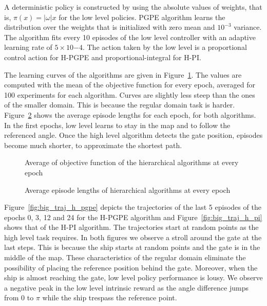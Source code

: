 A deterministic policy is constructed by using the absolute values of  weights, that is,  $\pi(x) = \left|\omega\right|x$ for the low level policies. PGPE algorithm learns the distribution over the weights that is initialized with zero mean and $10^{-3}$ variance. The algorithm fits every 10 episodes of the low level controller with an adaptive learning rate of $5\times10{-4}$. The action taken by the low level is a proportional control action for H-PGPE and proportional-integral for H-PI. 

The learning curves of the algorithms are given in Figure~\ref{fig:big_hier_J}. The values are computed with the mean of the objective function for every epoch, averaged for 100 experiments for each algorithm. Curves are slightly less steep than the ones of the smaller domain. This is because the regular domain task is harder. Figure~\ref{fig:big_hier_L} shows the average episode lengths for each epoch, for both algorithms. In the first epochs, low level learns to stay in the map and to follow the referenced angle. Once the high level algorithm detects the gate position, episodes become much shorter, to approximate the shortest path. 

\begin{figure}[t]
	\centering
    \setlength\figureheight{6cm}  
	\setlength\figurewidth{\textwidth}
	
    \caption[J comparison, regular environment]{Average of objective function of the hierarchical algorithms at every epoch}
    \label{fig:big_hier_J}
\end{figure}
\begin{figure}[t]
    \setlength\figureheight{6cm}  
	\setlength\figurewidth{\textwidth}
	
    \caption[Episode length comparison, regular environment]{Average episode lengths of hierarchical algorithms at every epoch}
    \label{fig:big_hier_L}
\end{figure}

\clearpage

Figure~\ref{fig:big_traj_h_pgpe} depicts the trajectories of the last 5 episodes of the epochs 0, 3, 12 and 24 for the H-PGPE algorithm and Figure~\ref{fig:big_traj_h_pi} shows that of the H-PI algorithm. The trajectories start at random points as the high level task requires. In both figures we observe a stroll around the gate at the last steps. This is because the ship starts at random points and the gate is in the middle of the map. These characteristics of the regular domain eliminate the possibility of placing the reference position behind the gate. Moreover, when the ship is almost reaching the gate, low level policy performance is lousy. We observe a negative peak in the low level intrinsic reward as the angle difference jumps from 0 to $\pi$ while the ship trespass the reference point.


